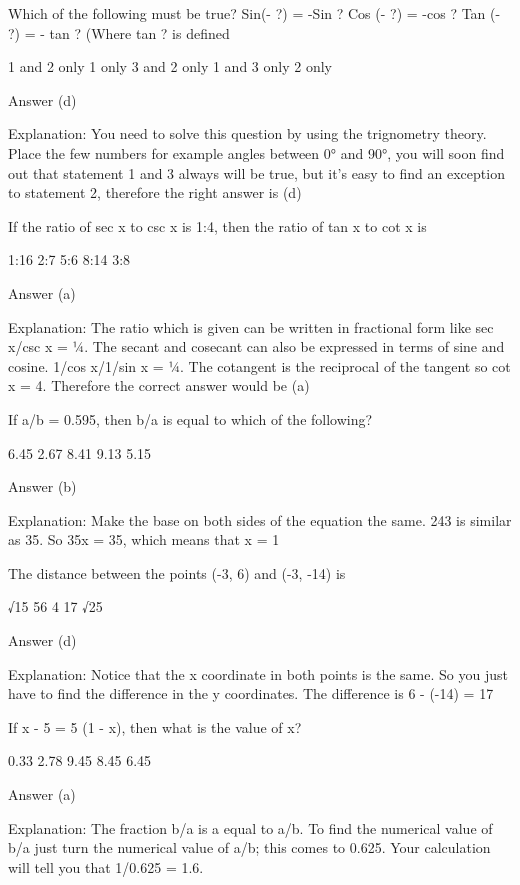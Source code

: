     Which of the following must be true?
        Sin(- ?) = -Sin ?
        Cos (- ?) = -cos ?
        Tan (- ?) = - tan ? (Where tan ? is defined
     

        1 and 2 only
        1 only
        3 and 2 only
        1 and 3 only
        2 only 

    Answer (d)

    Explanation: You need to solve this question by using the trignometry theory. Place the few numbers for example angles between 0° and 90°, you will soon find out that statement 1 and 3 always will be true, but it's easy to find an exception to statement 2, therefore the right answer is (d)

     

    If the ratio of sec x to csc x is 1:4, then the ratio of tan x to cot x is

        1:16
        2:7
        5:6
        8:14
        3:8 

    Answer (a)

    Explanation: The ratio which is given can be written in fractional form like sec x/csc x = ¼. The secant and cosecant can also be expressed in terms of sine and cosine. 1/cos x/1/sin x = ¼. The cotangent is the reciprocal of the tangent so cot x = 4. Therefore the correct answer would be (a)

    If a/b = 0.595, then b/a is equal to which of the following?

        6.45
        2.67
        8.41
        9.13
        5.15 

    Answer (b)

    Explanation: Make the base on both sides of the equation the same. 243 is similar as 35. So 35x  = 35, which means that x = 1

    The distance between the points (-3, 6) and (-3, -14) is

        √15
        56
        4
        17
        √25 

    Answer (d)

    Explanation: Notice that the x coordinate in both points is the same. So you just have to find the difference in the y coordinates. The difference is 6 - (-14) = 17

    If x - 5 = 5 (1 - x), then what is the value of x?

        0.33
        2.78
        9.45
        8.45
        6.45 

    Answer (a)

    Explanation: The fraction b/a is a equal to a/b. To find the numerical value of b/a just turn the numerical value of a/b; this  comes to 0.625. Your calculation will tell you that 1/0.625 = 1.6. 

